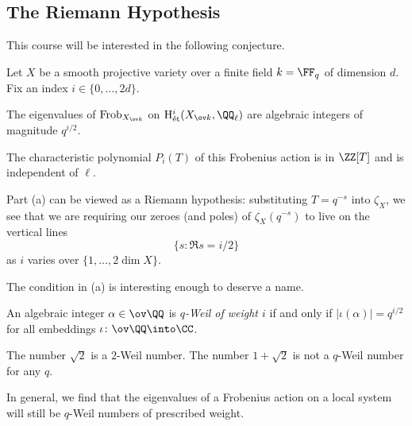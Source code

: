 \documentclass[../notes.tex]{subfiles}
\begin{document}
\subsection{The Riemann Hypothesis}
This course will be interested in the following conjecture.
\begin{conj}
	Let $X$ be a smooth projective variety over a finite field $k=\FF_q$ of dimension $d$. Fix an index $i\in\{0,\ldots,2d\}$.
	\begin{listalph}
		\item The eigenvalues of $\mathrm{Frob}_{X_{\ov k}}$ on $\mathrm H^i_{\mathrm{\acute et}}(X_{\ov k},\QQ_\ell)$ are algebraic integers of magnitude $q^{i/2}$.
		\item The characteristic polynomial $P_i(T)$ of this Frobenius action is in $\ZZ[T]$ and is independent of $\ell$.
	\end{listalph}
\end{conj}
\begin{remark}
	Part (a) can be viewed as a Riemann hypothesis: substituting $T=q^{-s}$ into $\zeta_X$, we see that we are requiring our zeroes (and poles) of $\zeta_X\left(q^{-s}\right)$ to live on the vertical lines
	\[\{s:\Re s=i/2\}\]
	as $i$ varies over $\{1,\ldots,2\dim X\}$.
\end{remark}
The condition in (a) is interesting enough to deserve a name.
\begin{defihelper}[$q$-Weil] 
	An algebraic integer $\alpha\in\ov\QQ$ is \textit{$q$-Weil of weight $i$} if and only if $\left|\iota(\alpha)\right|=q^{i/2}$ for all embeddings $\iota\colon\ov\QQ\into\CC$.
\end{defihelper}
\begin{example}
	The number $\sqrt2$ is a $2$-Weil number. The number $1+\sqrt2$ is not a $q$-Weil number for any $q$.
\end{example}
In general, we find that the eigenvalues of a Frobenius action on a local system will still be $q$-Weil numbers of prescribed weight.
\end{document}
